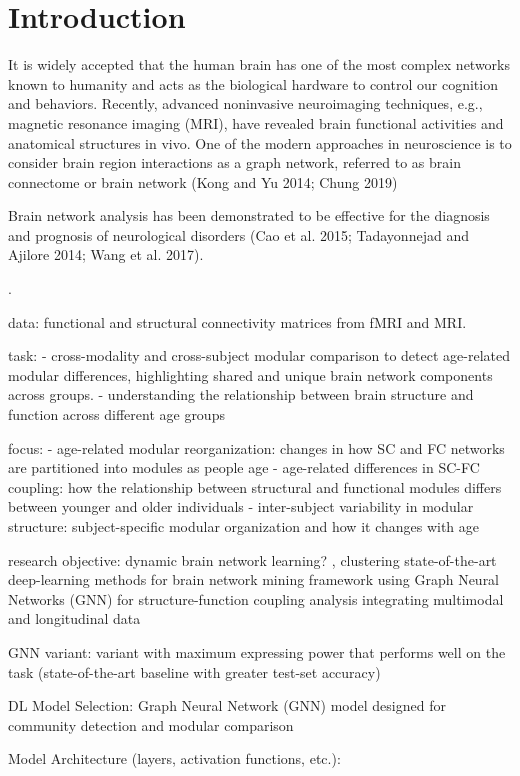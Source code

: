
\section{Introduction}


It is widely accepted that the human brain has one of the
most complex networks known to humanity and acts as the
biological hardware to control our cognition and behaviors.
Recently, advanced noninvasive neuroimaging techniques,
e.g., magnetic resonance imaging (MRI), have revealed
brain functional activities and anatomical structures in
vivo. One of the modern approaches in neuroscience is
to consider brain region interactions as a graph network,
referred to as brain connectome or brain network (Kong and
Yu 2014; Chung 2019) 

Brain network analysis has been
demonstrated to be effective for the diagnosis and prognosis
of neurological disorders (Cao et al. 2015; Tadayonnejad
and Ajilore 2014; Wang et al. 2017).



\cite{Zhang2022}.


data: functional and structural connectivity matrices from fMRI and MRI. 

task: 
- cross-modality and cross-subject modular comparison 
to detect age-related modular differences, highlighting shared 
and unique brain network components across groups. 
-  understanding the relationship between brain structure and function 
across different age groups

focus: 
- age-related modular reorganization: changes in how SC and FC networks are partitioned 
    into modules as people age
- age-related differences in SC-FC coupling: how the relationship between structural and 
    functional modules differs between younger and older individuals
- inter-subject variability in modular structure: subject-specific modular organization 
    and how it changes with age
\cite{Puxeddu2022}

research objective: 
dynamic brain network learning? \cite{Tang2023}, 
clustering
state-of-the-art deep-learning methods for brain network mining
framework using Graph Neural Networks (GNN) for structure-function coupling analysis
integrating multimodal and longitudinal data \cite{Luo2024} \cite{Zhang2022}


GNN variant: variant with maximum expressing power that performs
well on the task (state-of-the-art baseline with greater test-set
accuracy)

DL Model Selection: Graph Neural Network (GNN) model designed for 
community detection and modular comparison

Model Architecture (layers, activation functions, etc.):



